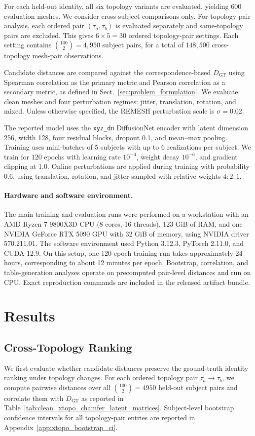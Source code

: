 \documentclass{article}
\begin{document}
For each held-out identity, all six topology variants are evaluated, yielding 600 evaluation meshes. We consider cross-subject comparisons only. For topology-pair analysis, each ordered pair $(\tau_a,\tau_b)$ is evaluated separately and same-topology pairs are excluded. This gives $6\times5=30$ ordered topology-pair settings. Each setting contains $\binom{100}{2}=4{,}950$ subject pairs, for a total of $148{,}500$ cross-topology mesh-pair observations.

Candidate distances are compared against the correspondence-based $D_{\mathrm{GT}}$ using Spearman correlation as the primary metric and Pearson correlation as a secondary metric, as defined in Sect.~\ref{sec:problem_formulation}. We evaluate clean meshes and four perturbation regimes: jitter, translation, rotation, and mixed. Unless otherwise specified, the REMESH perturbation scale is $\sigma=0.02$.

The reported model uses the \texttt{xyz\_dn} DiffusionNet encoder with latent dimension 256, width 128, four residual blocks, dropout 0.1, and mean--max pooling. Training uses mini-batches of 5 subjects with up to 6 realizations per subject. We train for 120 epochs with learning rate $10^{-4}$, weight decay $10^{-6}$, and gradient clipping at 1.0. Online perturbations are applied during training with probability 0.6, using translation, rotation, and jitter sampled with relative weights $4{:}2{:}1$.

\paragraph{Hardware and software environment.}
The main training and evaluation runs were performed on a workstation with an AMD Ryzen 7 9800X3D CPU
(8 cores, 16 threads), 123 GiB of RAM, and one NVIDIA GeForce RTX 5090 GPU
with 32 GiB of memory, using NVIDIA driver 570.211.01. The software environment
used Python 3.12.3, PyTorch 2.11.0, and CUDA 12.9. On this setup, one 120-epoch
training run takes approximately 24 hours, corresponding to about 12 minutes per
epoch. Bootstrap, correlation, and table-generation analyses operate on
precomputed pair-level distances and run on CPU. Exact reproduction commands are
included in the released artifact bundle.

\section{Results}
\label{sec:results}

\subsection{Cross-Topology Ranking}
\label{sec:xtopo_results}
We first evaluate whether candidate distances preserve the ground-truth identity ranking under topology changes. For each ordered topology pair $\tau_a \rightarrow \tau_b$, we compute pairwise distances over all $\binom{100}{2}=4950$ held-out subject pairs and correlate them with $D_{\mathrm{GT}}$ as reported in Table~\ref{tab:clean_xtopo_chamfer_latent_matrices}. Subject-level bootstrap confidence intervals for all topology-pair entries are reported in Appendix~\ref{app:xtopo_bootstrap_ci}.
\end{document}
